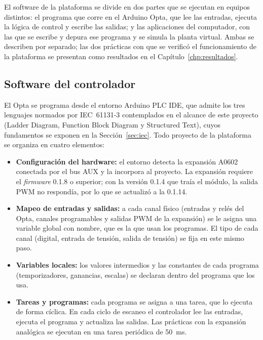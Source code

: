 \documentclass[12pt,a4paper,oneside]{report}
\begin{document}
El software de la plataforma se divide en dos partes que se ejecutan en equipos distintos: el programa que corre en el Arduino Opta, que lee las entradas, ejecuta la lógica de control y escribe las salidas; y las aplicaciones del computador, con las que se escribe y depura ese programa y se simula la planta virtual. Ambas se describen por separado; las dos prácticas con que se verificó el funcionamiento de la plataforma se presentan como resultados en el Capítulo~\ref{chp:resultados}.

\subsection{Software del controlador}
\label{subsec:sw_controlador}

El Opta se programa desde el entorno Arduino PLC IDE, que admite los tres lenguajes normados por IEC~61131-3 contemplados en el alcance de este proyecto (Ladder Diagram, Function Block Diagram y Structured Text), cuyos fundamentos se exponen en la Sección~\ref{sec:iec}. Todo proyecto de la plataforma se organiza en cuatro elementos:

\begin{itemize}
    \item \textbf{Configuración del hardware:} el entorno detecta la expansión A0602 conectada por el bus AUX y la incorpora al proyecto. La expansión requiere el \emph{firmware} 0.1.8 o superior; con la versión 0.1.4 que traía el módulo, la salida PWM no respondía, por lo que se actualizó a la 0.1.14.
    \item \textbf{Mapeo de entradas y salidas:} a cada canal físico (entradas y relés del Opta, canales programables y salidas PWM de la expansión) se le asigna una variable global con nombre, que es la que usan los programas. El tipo de cada canal (digital, entrada de tensión, salida de tensión) se fija en este mismo paso.
    \item \textbf{Variables locales:} los valores intermedios y las constantes de cada programa (temporizadores, ganancias, escalas) se declaran dentro del programa que los usa.
    \item \textbf{Tareas y programas:} cada programa se asigna a una tarea, que lo ejecuta de forma cíclica. En cada ciclo de escaneo el controlador lee las entradas, ejecuta el programa y actualiza las salidas. Las prácticas con la expansión analógica se ejecutan en una tarea periódica de 50~ms.
\end{itemize}
\end{document}

